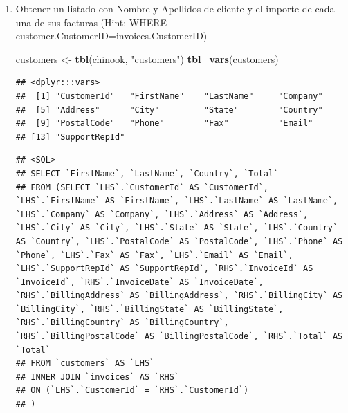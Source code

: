 \documentclass[]{book}
\newenvironment{Shaded}{\begin{snugshade}}{\end{snugshade}}
\newcommand{\DataTypeTok}[1]{\textcolor[rgb]{0.13,0.29,0.53}{#1}}
\newcommand{\KeywordTok}[1]{\textcolor[rgb]{0.13,0.29,0.53}{\textbf{#1}}}
\newcommand{\NormalTok}[1]{#1}
\newcommand{\OperatorTok}[1]{\textcolor[rgb]{0.81,0.36,0.00}{\textbf{#1}}}
\newcommand{\StringTok}[1]{\textcolor[rgb]{0.31,0.60,0.02}{#1}}
\begin{document}
\begin{enumerate}
\def\labelenumi{\arabic{enumi}.}
\setcounter{enumi}{3}
\item
  Obtener un listado con Nombre y Apellidos de cliente y el importe de cada una de sus facturas
  (Hint: WHERE customer.CustomerID=invoices.CustomerID)

\begin{Shaded}
\begin{Highlighting}[]
\NormalTok{customers <-}\StringTok{ }\KeywordTok{tbl}\NormalTok{(chinook, }\StringTok{"customers"}\NormalTok{)}
\KeywordTok{tbl_vars}\NormalTok{(customers) }
\end{Highlighting}
\end{Shaded}

\begin{verbatim}
## <dplyr:::vars>
##  [1] "CustomerId"   "FirstName"    "LastName"     "Company"     
##  [5] "Address"      "City"         "State"        "Country"     
##  [9] "PostalCode"   "Phone"        "Fax"          "Email"       
## [13] "SupportRepId"
\end{verbatim}

\begin{Shaded}
\end{Shaded}

\begin{verbatim}
## <SQL>
## SELECT `FirstName`, `LastName`, `Country`, `Total`
## FROM (SELECT `LHS`.`CustomerId` AS `CustomerId`, `LHS`.`FirstName` AS `FirstName`, `LHS`.`LastName` AS `LastName`, `LHS`.`Company` AS `Company`, `LHS`.`Address` AS `Address`, `LHS`.`City` AS `City`, `LHS`.`State` AS `State`, `LHS`.`Country` AS `Country`, `LHS`.`PostalCode` AS `PostalCode`, `LHS`.`Phone` AS `Phone`, `LHS`.`Fax` AS `Fax`, `LHS`.`Email` AS `Email`, `LHS`.`SupportRepId` AS `SupportRepId`, `RHS`.`InvoiceId` AS `InvoiceId`, `RHS`.`InvoiceDate` AS `InvoiceDate`, `RHS`.`BillingAddress` AS `BillingAddress`, `RHS`.`BillingCity` AS `BillingCity`, `RHS`.`BillingState` AS `BillingState`, `RHS`.`BillingCountry` AS `BillingCountry`, `RHS`.`BillingPostalCode` AS `BillingPostalCode`, `RHS`.`Total` AS `Total`
## FROM `customers` AS `LHS`
## INNER JOIN `invoices` AS `RHS`
## ON (`LHS`.`CustomerId` = `RHS`.`CustomerId`)
## )
\end{verbatim}


\end{enumerate}
\end{document}
